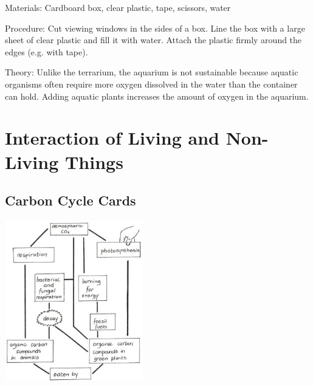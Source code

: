 \begin{multicols}{2}
\begin{description*}
\item[Materials:]{Cardboard box, clear plastic, tape, scissors, water}
\item[Procedure:]{Cut viewing windows in the sides of a box. Line the box with a large sheet of clear plastic and fill it with water. Attach the plastic firmly around the edges (e.g. with tape).}
\item[Theory:]{Unlike the terrarium, the aquarium is not sustainable because aquatic organisms often require more oxygen dissolved  in the water than the container can hold. Adding aquatic plants increases the amount of oxygen in the aquarium.}
\end{description*}


\section*{Interaction of Living and Non-Living Things}


\subsection{Carbon Cycle Cards} %

\begin{center}
\includegraphics[width=0.45\textwidth]{./img/vso/carbon-cycle.jpg}
\end{center}


\end{multicols}
